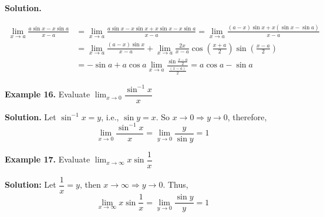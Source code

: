 \documentclass[../../main.tex]{subfiles}
\begin{document}
\textbf{Solution.} 

\begin{align*}
    \lim_{x\rightarrow a}\frac{a\sin x-x\sin a}{x-a} &= \lim_{x\rightarrow a}\frac{a\sin x-x\sin x+x\sin x-x\sin a}{x-a} = \lim_{x\rightarrow a}\frac{(a-x)\sin x+x(\sin x-\sin a)}{x-a} \\
    &= \lim_{x\rightarrow a}\frac{(a-x)\sin x}{x-a} + \lim_{x\rightarrow a}\frac{2x}{x-a}\cos \left(\frac{x+a}{2}\right)\sin \left(\frac{x-a}{2}\right) \\ 
    &= -\sin a+a \cos a \lim_{x\to a}\frac{\sin \frac{x-a}{2}}{\frac{(x-a)}{2}} = a\cos a - \sin a
\end{align*}

\vspace{0.2cm}
\textbf{Example 16.}
\vspace{0.2cm}
Evaluate $\lim_{x\rightarrow 0}\dfrac{\sin^{-1}{x}}{x}$

\textbf{Solution.} Let $\sin^{-1}{x} =y$, i.e.,  $\sin y = x$. So $x\rightarrow 0 \Rightarrow y\rightarrow0$, therefore,
\begin{equation*}
    \lim_{x\rightarrow 0}\frac{\sin^{-1}{x}}{x} = \lim_{y\to0} \frac{y}{\sin y} = 1
\end{equation*}

\vspace{0.2cm}
\textbf{Example 17.}
\vspace{0.2cm}
Evaluate $\lim_{x \rightarrow \infty}x\sin \dfrac{1}{x}$

\textbf{Solution:} Let $\dfrac{1}{x} = y$, then $x\rightarrow \infty \Rightarrow y\rightarrow 0$. Thus,
\begin{equation*}
    \lim_{x \rightarrow \infty}x\sin \frac{1}{x} = \lim_{y\to0}\frac{\sin y}{y} = 1
\end{equation*}
\end{document}
